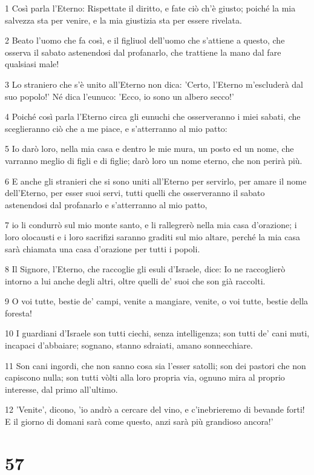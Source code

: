 \par 1 Così parla l'Eterno: Rispettate il diritto, e fate ciò ch'è giusto; poiché la mia salvezza sta per venire, e la mia giustizia sta per essere rivelata.
\par 2 Beato l'uomo che fa così, e il figliuol dell'uomo che s'attiene a questo, che osserva il sabato astenendosi dal profanarlo, che trattiene la mano dal fare qualsiasi male!
\par 3 Lo straniero che s'è unito all'Eterno non dica: 'Certo, l'Eterno m'escluderà dal suo popolo!' Né dica l'eunuco: 'Ecco, io sono un albero secco!'
\par 4 Poiché così parla l'Eterno circa gli eunuchi che osserveranno i miei sabati, che sceglieranno ciò che a me piace, e s'atterranno al mio patto:
\par 5 Io darò loro, nella mia casa e dentro le mie mura, un posto ed un nome, che varranno meglio di figli e di figlie; darò loro un nome eterno, che non perirà più.
\par 6 E anche gli stranieri che si sono uniti all'Eterno per servirlo, per amare il nome dell'Eterno, per esser suoi servi, tutti quelli che osserveranno il sabato astenendosi dal profanarlo e s'atterranno al mio patto,
\par 7 io li condurrò sul mio monte santo, e li rallegrerò nella mia casa d'orazione; i loro olocausti e i loro sacrifizi saranno graditi sul mio altare, perché la mia casa sarà chiamata una casa d'orazione per tutti i popoli.
\par 8 Il Signore, l'Eterno, che raccoglie gli esuli d'Israele, dice: Io ne raccoglierò intorno a lui anche degli altri, oltre quelli de' suoi che son già raccolti.
\par 9 O voi tutte, bestie de' campi, venite a mangiare, venite, o voi tutte, bestie della foresta!
\par 10 I guardiani d'Israele son tutti ciechi, senza intelligenza; son tutti de' cani muti, incapaci d'abbaiare; sognano, stanno sdraiati, amano sonnecchiare.
\par 11 Son cani ingordi, che non sanno cosa sia l'esser satolli; son dei pastori che non capiscono nulla; son tutti vòlti alla loro propria via, ognuno mira al proprio interesse, dal primo all'ultimo.
\par 12 'Venite', dicono, 'io andrò a cercare del vino, e c'inebrieremo di bevande forti! E il giorno di domani sarà come questo, anzi sarà più grandioso ancora!'

\chapter{57}

